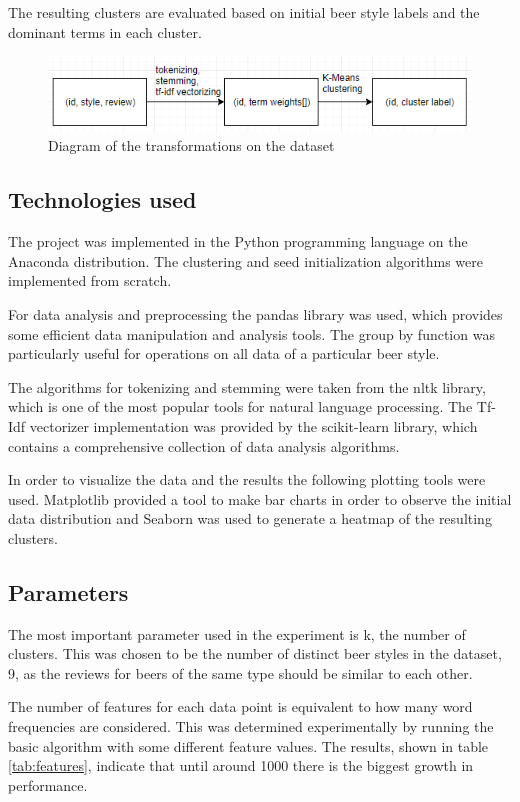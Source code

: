 \documentclass[12pt]{article}
\begin{document}
	The resulting clusters are evaluated based on initial beer style labels and the dominant terms in each cluster.
	
	\begin{figure}[H]
		\includegraphics[width=\linewidth]{resources/model.png}
		\caption{Diagram of the transformations on the dataset}
		\label{fig:modelOverview}
	\end{figure}

	\subsection{Technologies used}
	The project was implemented in the Python programming language on the Anaconda distribution. The clustering and seed initialization algorithms were implemented from scratch.
	
	For data analysis and preprocessing the pandas\cite{Pandas} library was used, which provides some efficient data manipulation and analysis tools. The group by function was particularly useful for operations on all data of a particular beer style. 
	
	The algorithms for tokenizing and stemming were taken from the nltk library\cite{NLTK}, which is one of the most popular tools for natural language processing. The Tf-Idf vectorizer implementation was provided by the scikit-learn library\cite{sk-learn}, which contains a comprehensive collection of data analysis algorithms.
	
	In order to visualize the data and the results the following plotting tools were used. Matplotlib\cite{Matplotlib} provided a tool to make bar charts in order to observe the initial data distribution and Seaborn\cite{Seaborn} was used to generate a heatmap of the resulting clusters.
		
	\subsection{Parameters}
	The most important parameter used in the experiment is k, the number of clusters. This was chosen to be the number of distinct beer styles in the dataset, 9, as the reviews for beers of the same type should be similar to each other.
	
	The number of features for each data point is equivalent to how many word frequencies are considered. This was determined experimentally by running the basic algorithm with some different feature values. The results, shown in table \ref{tab:features}, indicate that until around 1000 there is the biggest growth in performance.
	
\end{document}
